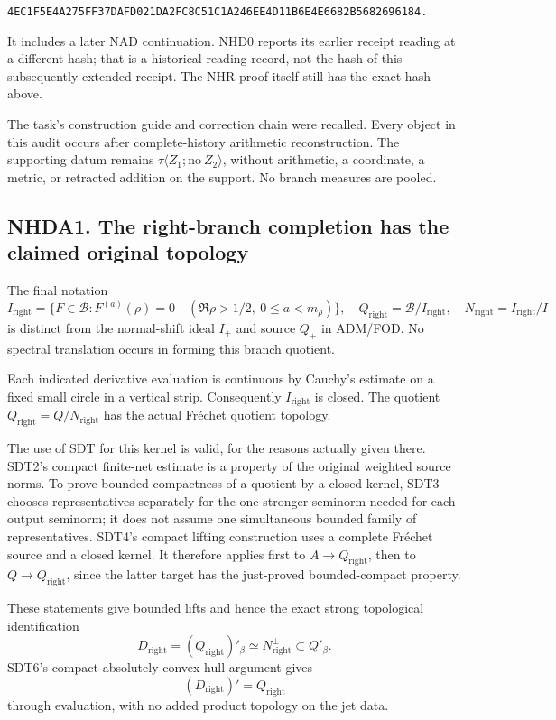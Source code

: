 \nolinkurl{4EC1F5E4A275FF37DAFD021DA2FC8C51C1A246EE4D11B6E4E6682B5682696184.}

It includes a later NAD continuation. NHD0 reports its earlier receipt
reading at a different hash; that is a historical reading record, not
the hash of this subsequently extended receipt. The NHR proof itself
still has the exact hash above.

The task's construction guide and correction chain were recalled. Every
object in this audit occurs after complete-history arithmetic
reconstruction. The supporting datum remains
\(\tau\langle Z_1;\mathrm{no}\ Z_2\rangle\), without arithmetic, a
coordinate, a metric, or retracted addition on the support. No branch
measures are pooled.

\subsection{NHDA1. The right-branch completion has the claimed original
topology}\label{nhda1.-the-right-branch-completion-has-the-claimed-original-topology}

The final notation \[
I_{\mathrm{right}}=\{F\in\mathcal B:
F^{(a)}(\rho)=0\quad
(\Re\rho>1/2,\ 0\le a<m_\rho)\},
\quad
Q_{\mathrm{right}}=\mathcal B/I_{\mathrm{right}},
\quad
N_{\mathrm{right}}=I_{\mathrm{right}}/I
\] is distinct from the normal-shift ideal \(I_+\) and source \(Q_+\) in
ADM/FOD. No spectral translation occurs in forming this branch quotient.

Each indicated derivative evaluation is continuous by Cauchy's estimate
on a fixed small circle in a vertical strip. Consequently
\(I_{\mathrm{right}}\) is closed. The quotient
\(Q_{\mathrm{right}}=Q/N_{\mathrm{right}}\) has the actual Fréchet
quotient topology.

The use of SDT for this kernel is valid, for the reasons actually given
there. SDT2's compact finite-net estimate is a property of the original
weighted source norms. To prove bounded-compactness of a quotient by a
closed kernel, SDT3 chooses representatives separately for the one
stronger seminorm needed for each output seminorm; it does not assume
one simultaneous bounded family of representatives. SDT4's compact
lifting construction uses a complete Fréchet source and a closed kernel.
It therefore applies first to \(A\to Q_{\mathrm{right}}\), then to
\(Q\to Q_{\mathrm{right}}\), since the latter target has the just-proved
bounded-compact property.

These statements give bounded lifts and hence the exact strong
topological identification \[
D_{\mathrm{right}}=(Q_{\mathrm{right}})'_\beta
\simeq N_{\mathrm{right}}^\perp\subset Q'_\beta.
\] SDT6's compact absolutely convex hull argument gives \[
(D_{\mathrm{right}})'=Q_{\mathrm{right}}
\] through evaluation, with no added product topology on the jet data.

